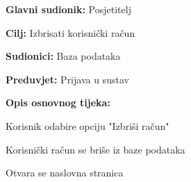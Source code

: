					\noindent {}
					\begin{packed_item}
						
						\item \textbf{Glavni sudionik: } Posjetitelj
						\item  \textbf{Cilj:}  Izbrisati korisnički račun
						\item  \textbf{Sudionici:}  Baza podataka
						\item  \textbf{Preduvjet:}  Prijava u sustav
						\item  \textbf{Opis osnovnog tijeka:}
						
						\item[] \begin{packed_enum}
							
							\item  Korisnik odabire opciju "Izbriši račun"
							\item  Korisnički račun se briše iz baze podataka
							\item  Otvara se naslovna stranica				
						\end{packed_enum}
					\end{packed_item}
				
